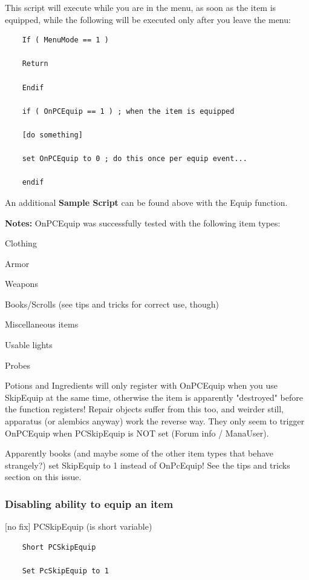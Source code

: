 This script will execute while you are in the menu, as soon as the item
is equipped, while the following will be executed only after you leave
the menu:

\begin{lstlisting}
	If ( MenuMode == 1 )
	
	Return
	
	Endif
	
	if ( OnPCEquip == 1 ) ; when the item is equipped
	
	[do something]
	
	set OnPCEquip to 0 ; do this once per equip event...
	
	endif
\end{lstlisting}

An additional \textbf{Sample Script} can be found above with the Equip
function.

\textbf{Notes:} OnPCEquip was successfully tested with the following item types:


Clothing

Armor

Weapons

Books/Scrolls (see tips and tricks for correct use, though)

Miscellaneous items

Usable lights

Probes

Potions and Ingredients will only register with OnPCEquip when you use
SkipEquip at the same time, otherwise the item is apparently "destroyed"
before the function registers! Repair objects suffer from this too, and
weirder still, apparatus (or alembics anyway) work the reverse way. They
only seem to trigger OnPCEquip when PCSkipEquip is NOT set (Forum info /
ManaUser).

Apparently books (and maybe some of the other item types that behave
strangely?) set SkipEquip to 1 instead of OnPcEquip! See the tips and
tricks section on this issue.

\hypertarget{disabling-ability-to-equip-an-item}{%
\subsubsection{Disabling ability to equip an
item}\label{disabling-ability-to-equip-an-item}}

{[}no fix{]} PCSkipEquip (is short variable)

\begin{lstlisting}	
	Short PCSkipEquip
	
	Set PcSkipEquip to 1
\end{lstlisting}

